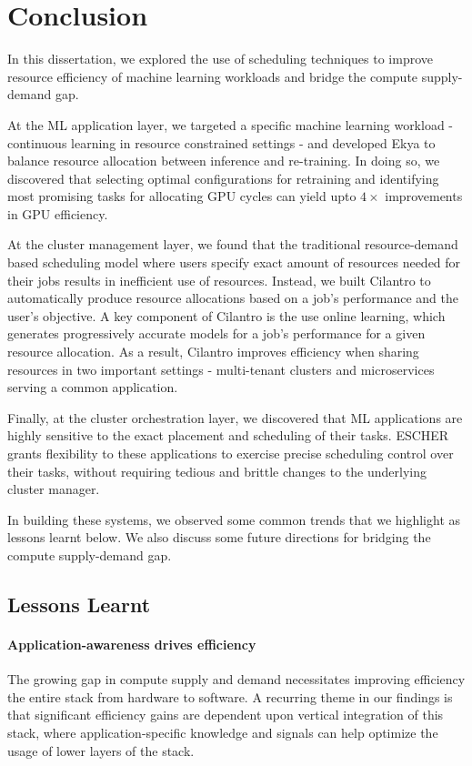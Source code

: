 \chapter{Conclusion}
\label{ch_conclusion}

In this dissertation, we explored the use of scheduling techniques to improve resource efficiency of machine learning workloads and bridge the compute supply-demand gap.

At the ML application layer, we targeted a specific machine learning workload - continuous learning in resource constrained settings - and developed Ekya to balance resource allocation between inference and re-training. In doing so, we discovered that selecting optimal configurations for retraining and identifying most promising tasks for allocating GPU cycles can yield upto $4\times$ improvements in GPU efficiency.

At the cluster management layer, we found that the traditional resource-demand based scheduling model where users specify exact amount of resources needed for their jobs results in inefficient use of resources. Instead, we built Cilantro to automatically produce resource allocations based on a job's performance and the user's objective. A key component of Cilantro is the use online learning, which generates progressively accurate models for a job's performance for a given resource allocation. As a result, Cilantro improves efficiency when sharing resources in two important settings - multi-tenant clusters and microservices serving a common application. 

Finally, at the cluster orchestration layer, we discovered that ML applications are highly sensitive to the exact placement and scheduling of their tasks. ESCHER grants flexibility to these applications to exercise precise scheduling control over their tasks, without requiring tedious and brittle changes to the underlying cluster manager.

In building these systems, we observed some common trends that we highlight as lessons learnt below. We also discuss some future directions for bridging the compute supply-demand gap.

\section{Lessons Learnt}

\subsubsection{Application-awareness drives efficiency}
The growing gap in compute supply and demand necessitates improving efficiency the entire stack from hardware to software. A recurring theme in our findings is that significant efficiency gains are dependent upon vertical integration of this stack, where application-specific knowledge and signals can help optimize the usage of lower layers of the stack.

